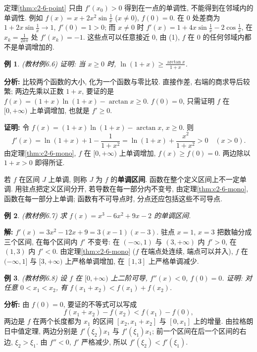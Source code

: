 \documentclass[UTF8,openany]{ctexbook}
\theoremstyle{chinesetextbook}
\newtheorem{example}{例}[section]
\newenvironment{cnproof}{\par\indent\textbf{证明:} \ignorespaces}{\par}
\newenvironment{cnsolution}{\par\indent\textbf{解:} \ignorespaces}{\par}
\begin{document}
定理\ref{thm:c2-6-point} 只由 $f'(x_0)>0$ 得到在一点的单调性, 不能得到在邻域内的单调性. 例如 $\displaystyle f(x)=x+2x^2\sin\frac1x$ ($x\ne0$), $f(0)=0$. 在 $0$ 处差商为 $\displaystyle1+2x\sin\frac1x\to1$, $f'(0)=1>0$; 而 $x\ne0$ 时 $\displaystyle f'(x)=1+4x\sin\frac1x-2\cos\frac1x$, 在 $\displaystyle x_k=\frac1{2k\pi}$ 处 $f'(x_k)=-1$. 这些点可以任意接近 $0$, 由 (1), $f$ 在 $0$ 的任何邻域内都不是单调增加的.
\begin{example}\label{ex:c2-6-6}
\textnormal{(教材例6.6)} 证明: 当 $x\ge0$ 时, $\displaystyle\ln(1+x)\ge\frac{\arctan x}{1+x}$.
\end{example}
\par\indent\textbf{分析:} 比较两个函数的大小, 化为一个函数与零比较. 直接作差, 右端的商求导后较繁; 两边先乘以正数 $1+x$, 要证的是 $f(x)=(1+x)\ln(1+x)-\arctan x\ge0$. $f(0)=0$, 只需证明 $f$ 在 $[0,+\infty)$ 上单调增加, 也就是 $f'\ge0$.
\begin{cnproof}
令 $f(x)=(1+x)\ln(1+x)-\arctan x$, $x\ge0$. 则
\[
f'(x)=\ln(1+x)+1-\frac1{1+x^2}=\ln(1+x)+\frac{x^2}{1+x^2}>0\quad(x>0).
\]
由定理\ref{thm:c2-6-mono}, $f$ 在 $[0,+\infty)$ 上单调增加, $f(x)\ge f(0)=0$. 两边除以 $1+x>0$ 即得所证.
\end{cnproof}
若 $f$ 在区间 $J$ 上单调, 则称 $J$ 为 $f$ 的\textbf{单调区间}. 函数在整个定义区间上不一定单调. 用驻点把定义区间分开, 若导数在每一部分内不变号, 由定理\ref{thm:c2-6-mono}, 函数在每一部分上单调; 函数有不可导点时, 分点还应包括这些不可导点.
\begin{example}\label{ex:c2-6-7}
\textnormal{(教材例6.7)} 求 $f(x)=x^3-6x^2+9x-2$ 的单调区间.
\end{example}
\begin{cnsolution}
$f'(x)=3x^2-12x+9=3(x-1)(x-3)$. 驻点 $x=1$, $x=3$ 把数轴分成三个区间, 在每个区间内 $f'$ 不变号: 在 $(-\infty,1)$ 与 $(3,+\infty)$ 内 $f'>0$, 在 $(1,3)$ 内 $f'<0$. 由定理\ref{thm:c2-6-mono} ($f$ 在端点处连续, 端点可以并入), $f$ 在 $(-\infty,1]$ 与 $[3,+\infty)$ 上严格单调增加, 在 $[1,3]$ 上严格单调减少.
\end{cnsolution}
\begin{example}\label{ex:c2-6-8}
\textnormal{(教材例6.8)} 设 $f$ 在 $[0,+\infty)$ 上二阶可导, $f''(x)<0$, $f(0)=0$. 证明: 对任意 $0<x_1<x_2$, 有 $f(x_1+x_2)<f(x_1)+f(x_2)$.
\end{example}
\par\indent\textbf{分析:} 由 $f(0)=0$, 要证的不等式可以写成
\[
f(x_1+x_2)-f(x_2)<f(x_1)-f(0),
\]
两边是 $f$ 在两个长度都为 $x_1$ 的区间 $[x_2,x_1+x_2]$ 与 $[0,x_1]$ 上的增量. 由拉格朗日中值定理, 两边分别是 $f'(\xi_2)x_1$ 与 $f'(\xi_1)x_1$; 前一个区间在后一个区间的右边, $\xi_2>\xi_1$. 由 $f''<0$, $f'$ 严格减少, 所以 $f'(\xi_2)<f'(\xi_1)$.
\end{document}
